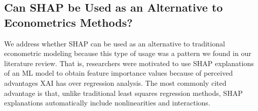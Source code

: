 \documentclass[mnsc,blindrev]{informs3}
\begin{document}
       
        

\subsection{Can SHAP be Used as an Alternative to Econometrics Methods?}
    We address whether SHAP can be used as an alternative to traditional econometric modeling because this type of usage was a pattern we found in our literature review. That is, researchers were motivated to use SHAP explanations of an ML model to obtain feature importance values because of perceived advantages XAI has over regression analysis. The most commonly cited advantage is that, unlike traditional least squares regression methods, SHAP explanations automatically include nonlinearities and interactions. 
    
\end{document}
